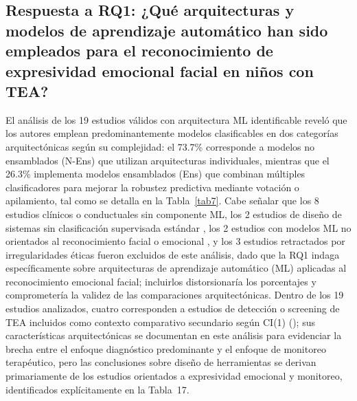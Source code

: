\documentclass[3p,twocolumn,times]{elsarticle}
\begin{document}
	\subsection{Respuesta a RQ1: ¿Qué arquitecturas y modelos de aprendizaje automático
		han sido empleados para el reconocimiento de expresividad emocional facial en niños
		con TEA?}\label{sec4a}
	
	El análisis de los 19 estudios válidos con arquitectura ML identificable reveló
	que los autores emplean predominantemente modelos clasificables en dos categorías
	arquitectónicas según su complejidad: el 73.7\% corresponde a modelos no
	ensamblados (N-Ens) que utilizan arquitecturas individuales, mientras que el
	26.3\% implementa modelos ensamblados (Ens) que combinan múltiples clasificadores
	para mejorar la robustez predictiva mediante votación o apilamiento, tal como se
	detalla en la Tabla~\ref{tab7}. Cabe señalar que los 8 estudios clínicos o
	conductuales sin componente ML, los 2 estudios de diseño de sistemas sin
	clasificación supervisada estándar \cite{Levy2024,Almeida2019}, los 2 estudios con
	modelos ML no orientados al reconocimiento facial o emocional
	\cite{Alsubai2025,OSullivan2023}, y los 3 estudios retractados por irregularidades
	éticas fueron excluidos de este análisis, dado que la RQ1 indaga específicamente
	sobre arquitecturas de aprendizaje automático (ML) aplicadas al reconocimiento
	emocional facial; incluirlos distorsionaría los porcentajes y comprometería la
	validez de las comparaciones arquitectónicas. Dentro de los 19 estudios analizados,
	cuatro corresponden a estudios de detección o screening de TEA incluidos como
	contexto comparativo secundario según CI(1) (\cite{Shaik2025,Ahmad2024,Radocaj2025,Alam2025});
	sus características arquitectónicas se documentan en este análisis para evidenciar
	la brecha entre el enfoque diagnóstico predominante y el enfoque de monitoreo
	terapéutico, pero las conclusiones sobre diseño de herramientas se derivan
	primariamente de los estudios orientados a expresividad emocional y monitoreo,
	identificados explícitamente en la Tabla~17.
	
\end{document}
